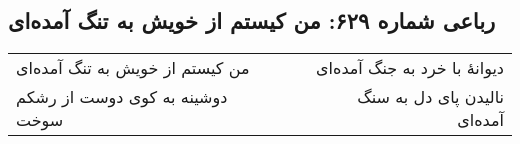 \begin{center}
\section*{رباعی شماره ۶۲۹: من کیستم از خویش به تنگ آمده‌ای}
\label{sec:sh629}
\begin{longtable}{l p{0.5cm} r}
من کیستم از خویش به تنگ آمده‌ای
&&
دیوانهٔ با خرد به جنگ آمده‌ای
\\
دوشینه به کوی دوست از رشکم سوخت
&&
نالیدن پای دل به سنگ آمده‌ای
\\
\end{longtable}
\end{center}
